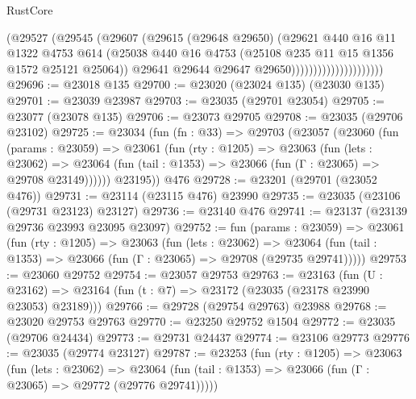 \begin{lexlean}{RustCore}
\begin{coremodule}
                                    (@29527
                                      (@29545
                                        (@29607
                                          (@29615
                                            (@29648 @29650)
                                            (@29621
                                              @440
                                              @16
                                              @11
                                              @1322
                                              @4753
                                              @614
                                              (@25038
                                                @440
                                                @16
                                                @4753
                                                (@25108 @235 @11 @15 @1356 @1572 @25121 @25064))
                                              @29641
                                              @29644
                                              @29647
                                              @29650)))))))))))))))))))))
@29696 := @23018 @135
@29700 := @23020 (@23024 @135) (@23030 @135)
@29701 := @23039 @23987
@29703 := @23035 (@29701 @23054)
@29705 := @23077 (@23078 @135)
@29706 := @23073 @29705
@29708 := @23035 (@29706 @23102)
@29725 := @23034
    (fun (fn : @33) =>
    @29703
      (@23057
        (@23060
          (fun (params : @23059) =>
          @23061
            (fun (rty : @1205) =>
            @23063
              (fun (lets : @23062) =>
              @23064 (fun (tail : @1353) => @23066 (fun (Γ : @23065) => @29708 @23149))))))
        @23195))
    @476
@29728 := @23201 (@29701 (@23052 @476))
@29731 := @23114 (@23115 @476) @23990
@29735 := @23035 (@23106 (@29731 @23123) @23127)
@29736 := @23140 @476
@29741 := @23137 (@23139 @29736 @23993 @23095 @23097)
@29752 := fun (params : @23059) =>
  @23061
    (fun (rty : @1205) =>
    @23063
      (fun (lets : @23062) =>
      @23064 (fun (tail : @1353) => @23066 (fun (Γ : @23065) => @29708 (@29735 @29741)))))
@29753 := @23060 @29752
@29754 := @23057 @29753
@29763 := @23163
    (fun (U : @23162) => @23164 (fun (t : @7) => @23172 (@23035 (@23178 @23990 @23053) @23189)))
@29766 := @29728 (@29754 @29763) @23988
@29768 := @23020 @29753 @29763
@29770 := @23250 @29752 @1504
@29772 := @23035 (@29706 @24434)
@29773 := @29731 @24437
@29774 := @23106 @29773
@29776 := @23035 (@29774 @23127)
@29787 := @23253
    (fun (rty : @1205) =>
    @23063
      (fun (lets : @23062) =>
      @23064 (fun (tail : @1353) => @23066 (fun (Γ : @23065) => @29772 (@29776 @29741)))))

\end{coremodule}
\end{lexlean}

